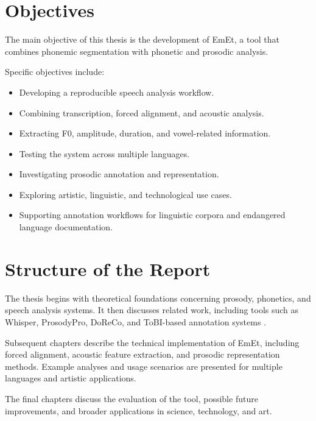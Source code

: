 \section{Objectives}

The main objective of this thesis is the development of EmEt, a tool that combines phonemic segmentation with phonetic and prosodic analysis.

Specific objectives include:

\begin{itemize}
\item Developing a reproducible speech analysis workflow.
\item Combining transcription, forced alignment, and acoustic analysis.
\item Extracting F0, amplitude, duration, and vowel-related information.
\item Testing the system across multiple languages.
\item Investigating prosodic annotation and representation.
\item Exploring artistic, linguistic, and technological use cases.
\item Supporting annotation workflows for linguistic corpora and endangered language documentation.
\end{itemize}

\section{Structure of the Report}

The thesis begins with theoretical foundations concerning prosody, phonetics, and speech analysis systems. It then discusses related work, including tools such as Whisper, ProsodyPro, DoReCo, and ToBI-based annotation systems \cite{radford2023whisper,xu2013prosodypro,paschen2020doreco,doreco2024website,beckman2006tobi,jun2005prosodic,pierrehumbert1980phonology}.

Subsequent chapters describe the technical implementation of EmEt, including forced alignment, acoustic feature extraction, and prosodic representation methods. Example analyses and usage scenarios are presented for multiple languages and artistic applications.

The final chapters discuss the evaluation of the tool, possible future improvements, and broader applications in science, technology, and art.

\newpage